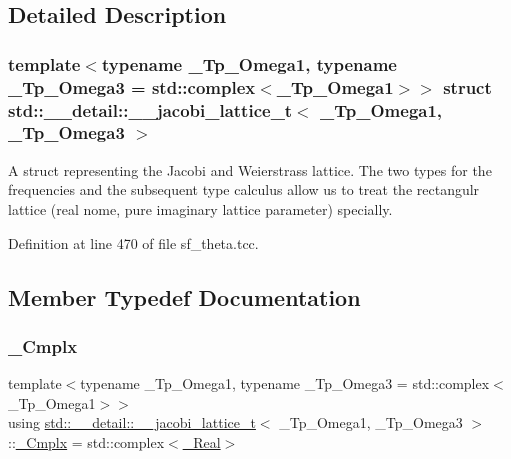\subsection{Detailed Description}
\subsubsection*{template$<$typename \+\_\+\+Tp\+\_\+\+Omega1, typename \+\_\+\+Tp\+\_\+\+Omega3 = std\+::complex$<$\+\_\+\+Tp\+\_\+\+Omega1$>$$>$\newline
struct std\+::\+\_\+\+\_\+detail\+::\+\_\+\+\_\+jacobi\+\_\+lattice\+\_\+t$<$ \+\_\+\+Tp\+\_\+\+Omega1, \+\_\+\+Tp\+\_\+\+Omega3 $>$}

A struct representing the Jacobi and Weierstrass lattice. The two types for the frequencies and the subsequent type calculus allow us to treat the rectangulr lattice (real nome, pure imaginary lattice parameter) specially. 

Definition at line 470 of file sf\+\_\+theta.\+tcc.



\subsection{Member Typedef Documentation}
\mbox{\label{structstd_1_1____detail_1_1____jacobi__lattice__t_a77e286c37544d6ba5e4fb5542d3aad5f}} 
\subsubsection{\texorpdfstring{\+\_\+\+Cmplx}{\_Cmplx}}
{\footnotesize\ttfamily template$<$typename \+\_\+\+Tp\+\_\+\+Omega1, typename \+\_\+\+Tp\+\_\+\+Omega3 = std\+::complex$<$\+\_\+\+Tp\+\_\+\+Omega1$>$$>$ \\
using \hyperlink{structstd_1_1____detail_1_1____jacobi__lattice__t}{std\+::\+\_\+\+\_\+detail\+::\+\_\+\+\_\+jacobi\+\_\+lattice\+\_\+t}$<$ \+\_\+\+Tp\+\_\+\+Omega1, \+\_\+\+Tp\+\_\+\+Omega3 $>$\+::\hyperlink{structstd_1_1____detail_1_1____jacobi__lattice__t_a77e286c37544d6ba5e4fb5542d3aad5f}{\+\_\+\+Cmplx} =  std\+::complex$<$\hyperlink{structstd_1_1____detail_1_1____jacobi__lattice__t_afdf4a474bd195f7b6062b4782202adc7}{\+\_\+\+Real}$>$}



